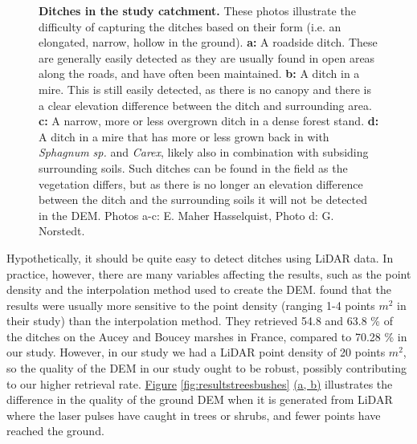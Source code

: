\documentclass[11pt, review]{elsarticle} %
\begin{document}
\begin{figure} [!htb]
    \caption{\textbf{Ditches in the study catchment.} These photos illustrate the difficulty of capturing the ditches based on their form (i.e. an elongated, narrow, hollow in the ground). \textbf{a: }A roadside ditch. These are generally easily detected as they are usually found in open areas along the roads, and have often been maintained. \textbf{b: }A ditch in a mire. This is still easily detected, as there is no canopy and there is a clear elevation difference between the ditch and surrounding area. \textbf{c: }A narrow, more or less  overgrown ditch in a dense forest stand. \textbf{d: }A ditch in a mire that has more or less grown back in with \textit{Sphagnum sp.} and \textit{Carex}, likely also in combination with subsiding surrounding soils. Such ditches can be found in the field as the vegetation differs, but as there is no longer an elevation difference between the ditch and the surrounding soils it will not be detected in the DEM. \newline Photos a-c: E. Maher Hasselquist, Photo d: G. Norstedt.}
    \label{fig:ditchpictures}
\end{figure}

Hypothetically, it should be quite easy to detect ditches using LiDAR data. In practice, however, there are many variables affecting the results, such as the point density and the interpolation method used to create the DEM. \citet{rapinel} found that the results were usually more sensitive to the point density (ranging 1-4 points $m^{2}$ in their study) than the interpolation method. They retrieved 54.8 and 63.8 \% of the ditches on the Aucey and Boucey marshes in France, compared to 70.28 \% in our study. However, in our study we had a LiDAR point density of 20 points $m^{2}$, so the quality of the DEM in our study ought to be robust, possibly contributing to our higher retrieval rate. \hyperref[fig:resultstreesbushes]{Figure} \ref{fig:resultstreesbushes} \hyperref[fig:resultstreesbushes]{(a, b)} illustrates the difference in the quality of the ground DEM when it is generated from LiDAR where the laser pulses have caught in trees or shrubs, and fewer points have reached the ground.
\end{document}
